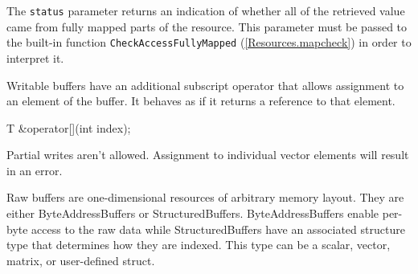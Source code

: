The \texttt{status} parameter returns an indication of whether all of the retrieved value
came from fully mapped parts of the resource.
This parameter must be passed to the built-in function \texttt{CheckAccessFullyMapped} (\ref{Resources.mapcheck})
in order to interpret it.

Writable buffers have an additional subscript operator that allows assignment to an element of the buffer.
It behaves as if it returns a reference to that element.
\begin{HLSL}
 T &operator[](int index);
\end{HLSL}

Partial writes aren't allowed.
Assignment to individual vector elements will result in an error.


Raw buffers are one-dimensional resources of arbitrary memory layout.
They are either ByteAddressBuffers or StructuredBuffers.
ByteAddressBuffers enable per-byte access to the raw data while
StructuredBuffers have an associated structure type that determines how they are
indexed. This type can be a scalar, vector, matrix, or user-defined struct.


